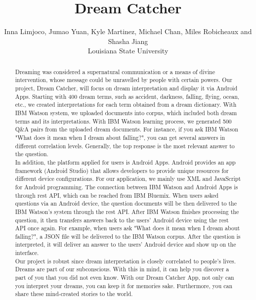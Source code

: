 \documentclass[twoside]{article}
\title{\vspace{-15mm}\fontsize{24pt}{14pt}\selectfont\textbf{Dream Catcher}} %
\author{
\small
{Inna Limjoco, Jumao Yuan, Kyle Martinez,  Michael Chan, Miles Robicheaux and Shasha Jiang}%
\\
\normalsize Louisiana State University \\ 
\vspace{-5mm}
}
\date{}
\begin{document}
\maketitle %

\thispagestyle{fancy} %


\begin{abstract}
{\selectfont

		Dreaming was considered a supernatural communication or a means of divine intervention, whose message could be unravelled by people with certain powers. Our project, Dream Catcher, will focus on dream interpretation and display it via Android Apps. Starting with 400 dream terms, such as accident, darkness, falling, flying, ocean, etc., we created interpretations for each term obtained from a dream dictionary. With IBM Watson system, we uploaded documents into corpus, which included both dream terms and its interpretations. With IBM Watson learning process, we generated 500 Q\&A pairs from the uploaded dream documents. For instance, if you ask IBM Watson "What does it mean when I dream about falling?", you can get several answers in different correlation levels. Generally, the top response is the most relevant answer to the question. \\

	In addition, the platform applied for users is Android Apps. Android provides an app framework (Android Studio) that allows developers to provide unique resources for different device configurations. For our application, we mainly use XML and JavaScript for Android programming.  The connection between IBM Watson and Android Apps is through rest API, which can be reached from IBM Bluemix. When users asked questions via an Android device, the question documents will be then delivered to the IBM Watson's system through the rest API. After IBM Watson finishes processing the question, it then transfers answers back to the users' Android device using the rest API once again. For example, when users ask "What does it mean when I dream about falling?",  a  JSON file will be delivered to the IBM Watson corpus. After the question is interpreted, it will deliver an answer to the users' Android device and show up on the interface. \\

	Our project is robust since dream interpretation is closely correlated to people's lives. Dreams are part of our subconscious. With this in mind, it can help you discover a part of you that you did not even know. With our Dream Catcher App, not only can you interpret your dreams, you can keep it for memories sake. Furthermore, you can share these mind-created stories to the world.  \\

}
\noindent

\end{abstract}
\end{document}
